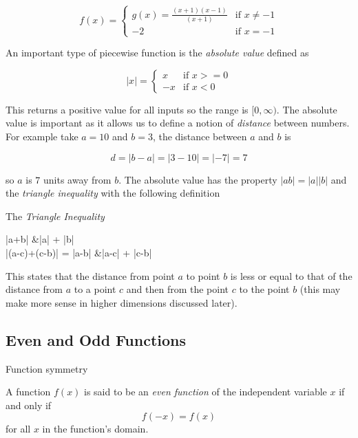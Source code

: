         $$
        f(x) =
        \begin{cases}
            g(x) = \frac{(x+1)(x-1)}{(x+1)} & \text{if } x \neq -1 \\
            -2 & \text{if } x = -1
        \end{cases}
        $$

        An important type of piecewise function is the \textit{absolute value} defined as

        \begin{equation}
            |x| =
            \begin{cases}
                x & \text{if } x >= 0 \\
                -x & \text{if } x < 0
            \end{cases}
        \end{equation}

        \noindent This returns a positive value for all inputs so the range is $[0,\infty)$. The absolute value is important as it allows us to define a notion of \textit{distance} between numbers. For example take $a = 10$ and $b = 3$, the distance between $a$ and $b$ is

        \begin{equation}
            d = |b - a| = |3 - 10| = |-7| = 7
        \end{equation}

        \noindent so $a$ is $7$ units away from $b$. The absolute value has the property $|ab| = |a||b|$ and the \textit{triangle inequality} with the following definition

        \begin{definition}
            The \textit{Triangle Inequality}

            \begin{aequation}
                |a+b| &\leq |a| + |b| \\
                |(a-c)+(c-b)| = |a-b| &\leq |a-c| + |c-b|
            \end{aequation}
        \end{definition}

        \noindent This states that the distance from point $a$ to point $b$ is less or equal to that of the distance from $a$ to a point $c$ and then from the point $c$ to the point $b$ (this may make more sense in higher dimensions discussed later).

        \subsection{Even and Odd Functions}
        Function symmetry
        \begin{definition}
            A function $f(x)$ is said to be an \textit{even function} of the independent variable $x$ if and only if
            $$
            f(-x) = f(x)
            $$
            for all $x$ in the function's domain.
        \end{definition}

